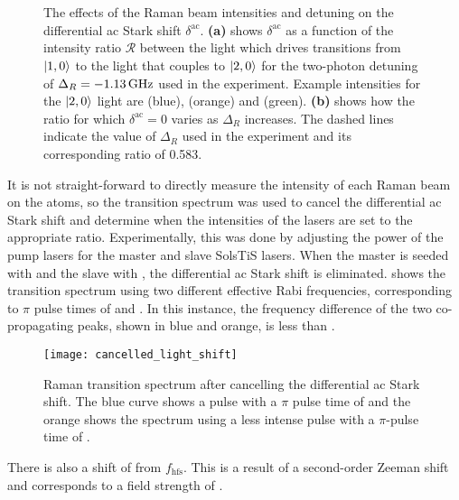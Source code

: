 \begin{figure}[htbp!]
	\centering
	\def\svgwidth{\columnwidth}
	\\
\\
	\caption[Differential ac Stark shift as a function of two-photon
  detuning and Raman beam intensities.]{The effects of the Raman beam
  intensities and detuning on the differential ac Stark shift
  \(\delta^\text{ac}\).
\textbf{(a)} shows \(\delta^\text{ac}\) as a function of the intensity ratio
\(\mathcal{R}\) between the light which drives transitions from
\(\ket{1,0}\) to the light that couples to \(\ket{2,0}\) for the
two-photon detuning of \(\Delta_R = -\sivalue{1.13}{\giga\hertz}\)
used in the experiment. Example
intensities for the \(\ket{2,0}\) light are
 (blue),
 (orange) and
 (green). \textbf{(b)} shows how
the ratio for which \(\delta^\text{ac} = 0\) varies as \(\Delta_R\)
increases. The dashed lines indicate the value of \(\Delta_R\) used in
the experiment and its corresponding ratio of 0.583.}
	\label{fig:light_shift_plots}
\end{figure}
\par\noindent
It is not straight-forward to directly measure the intensity of
each Raman beam on the atoms, so the transition spectrum was used to cancel the
differential ac Stark shift and determine when the intensities of the
lasers are set to the appropriate
ratio. Experimentally, this was done by adjusting the power of the
pump lasers for the master and slave SolsTiS lasers. When the master
is seeded with  and the slave with
, the differential ac Stark shift is eliminated.
 shows the transition spectrum using two different effective Rabi
frequencies, corresponding to \(\pi\) pulse times of
 and
. In this instance, the frequency difference of the two
co-propagating peaks, shown in blue and orange, is less than .
\begin{figure}[htpb!]
  \centering
  \texttt{[image: cancelled\_light\_shift]}
  \caption[Raman transition spectrum after cancelling the differential
  ac Stark shift.]{Raman transition spectrum after cancelling the differential
    ac Stark shift. The blue curve shows a pulse with a \(\pi\) pulse
  time of  and the orange shows the
  spectrum using a less intense pulse with a $\pi$-pulse time of
.}
  \label{fig:cancelled_light_shift}
\end{figure}
There is also a shift of  from
\(f_\text{hfs}\).
This is a result of a
second-order Zeeman shift and corresponds to a field strength of
.

